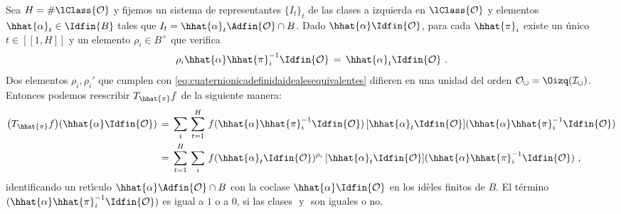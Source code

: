 Sea $H=\#\lClass{\cal{O}}$ y fijemos un sistema de representantes
$\{I_{t}\}_{t}$ de las clases a izquierda en $\lClass{\cal{O}}$ y elementos
$\hhat{\alpha}_{t}\in\Idfin{B}$ tales que
$I_{t}=\hhat{\alpha}_{t}\Adfin{\cal{O}}\cap B$. Dado
$\hhat{\alpha}\Idfin{\cal{O}}$, para cada $\hhat{\pi}_{i}$ existe un \'{u}nico
$t\in [\![1,H]\!]$ y un elemento $\rho_{i}\in B^{\times}$ que verifica
\begin{equation}
	\label{eq:cuaternionicadefinidaidealesequivalentes}
	\rho_{i}\hhat{\alpha}\hhat{\pi}_{i}^{-1}\Idfin{\cal{O}} \,=\,
		\hhat{\alpha}_{t}\Idfin{\cal{O}}
	\text{ .}
\end{equation}
%
Dos elementos $\rho_{i},\rho_{i}'$ que cumplen con
\eqref{eq:cuaternionicadefinidaidealesequivalentes} difieren en una
unidad del orden $\cal{O}_{t}=\Oizq(I_{t})$.
Entonces podemos reescribir $T_{\hhat{\pi}}f$ de la siguiente manera:
\begin{align*}
	\big(T_{\hhat{\pi}}f\big)
	(\hhat{\alpha}\Idfin{\cal{O}}) & \,=\,\sum_{i}\,\sum_{t=1}^{H}\,
		f(\hhat{\alpha}\hhat{\pi}_{i}^{-1}\Idfin{\cal{O}})\,
		[\hhat{\alpha}_{t}\Idfin{\cal{O}}]
			(\hhat{\alpha}\hhat{\pi}_{i}^{-1}\Idfin{\cal{O}}) \\
	& \,=\, \sum_{t=1}^{H}\,\sum_{i}\,
		f(\hhat{\alpha}_{t}\Idfin{\cal{O}})^{\rho_{i}}\,
		[\hhat{\alpha}_{t}\Idfin{\cal{O}}]
			(\hhat{\alpha}\hhat{\pi}_{i}^{-1}\Idfin{\cal{O}})
	\text{ ,}
\end{align*}
%
identificando un ret\'{\i}culo $\hhat{\alpha}\Adfin{\cal{O}}\cap B$ con la
coclase $\hhat{\alpha}\Idfin{\cal{O}}$ en los id\`{e}les finitos de $B$.
El t\'{e}rmino
\begin{math}
	[\hhat{\alpha}_{t}\Idfin{\cal{O}}]
			(\hhat{\alpha}\hhat{\pi}_{i}^{-1}\Idfin{\cal{O}})
\end{math}
es igual a $1$ o a $0$, si las clases
\begin{math}
	[\hhat{\alpha}_{t}\Idfin{\cal{O}}]
\end{math}
y
\begin{math}
	[\hhat{\alpha}\hhat{\pi}_{i}^{-1}\Idfin{\cal{O}}]
\end{math}
son iguales o no.

